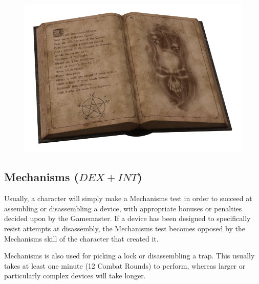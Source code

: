 \begin{figure}[h]
\begin{center}
\includegraphics[scale=0.2]{img/OpenBook.png}
\end{center}
\end{figure}


\subsection{Mechanisms ($DEX+INT$)}
Usually, a character will simply make a Mechanisms test in order to succeed at assembling or disassembling a device, with appropriate bonuses or penalties decided upon by the Gamemaster. If a device has been designed to specifically resist attempts at disassembly, the Mechanisms test becomes opposed by the Mechanisms skill of the character that created it. 

Mechanisms is also used for picking a lock or disassembling a trap. This usually takes at least one minute (12 Combat Rounds) to perform, whereas larger or particularly complex devices will take longer.

